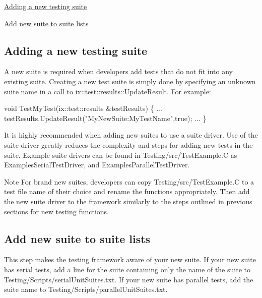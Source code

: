 \begin{DoxyItemize}
\item \hyperlink{testing_reference_newsuite}{Adding a new testing suite}
\item \hyperlink{testing_reference_addlist}{Add new suite to suite lists}
\end{DoxyItemize}\hypertarget{testing_reference_newsuite}{}\subsection{Adding a new testing suite}\label{testing_reference_newsuite}
A new suite is required when developers add tests that do not fit into any existing suite. Creating a new test suite is simply done by specifying an unknown suite name in a call to ix\+::test\+::results\+::\+Update\+Result. For example\+:


\begin{DoxyCode}
\textcolor{keywordtype}{void} TestMyTest(ix::test::results &testResults)
\{
  ...
  testResults.UpdateResult(\textcolor{stringliteral}{"MyNewSuite:MyTestName"},\textcolor{keyword}{true});
  ...
\}
\end{DoxyCode}


It is highly recommended when adding new suites to use a suite driver. Use of the suite driver greatly reduces the complexity and steps for adding new tests in the suite. Example suite drivers can be found in Testing/src/\+Test\+Example.\+C as Examples\+Serial\+Test\+Driver, and Examples\+Parallel\+Test\+Driver.

\begin{DoxyNote}{Note}
For brand new suites, developers can copy Testing/src/\+Test\+Example.\+C to a test file name of their choice and rename the functions appropriately. Then add the new suite driver to the framework similarly to the steps outlined in previous sections for new testing functions.
\end{DoxyNote}
\hypertarget{testing_reference_addlist}{}\subsection{Add new suite to suite lists}\label{testing_reference_addlist}
This step makes the testing framework aware of your new suite. If your new suite has serial tests, add a line for the suite containing only the name of the suite to Testing/\+Scripts/serial\+Unit\+Suites.\+txt. If your new suite has parallel tests, add the suite name to Testing/\+Scripts/parallel\+Unit\+Suites.\+txt.

